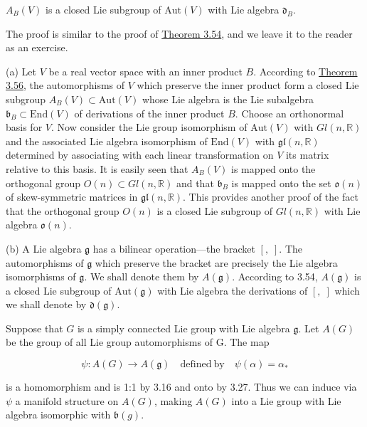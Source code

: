 \begin{theorem}\label{thm:3.56}
$ A_{B}(V) $ is a closed Lie subgroup of  $ \mathrm{Aut}(V) $ with Lie algebra  $ \mathfrak{d}_{B} $.

The proof is similar to the proof of \hyperref[thm:3.54]{Theorem 3.54}, and we leave it to the reader as an exercise.

\end{theorem}
\label{thm:3.57} (a) Let $V$ be a real vector space with an inner product $B$. According to \hyperref[thm:3.56]{Theorem 3.56}, the automorphisms of $V$ which preserve the inner product form a closed Lie subgroup $A_B(V) \subset \mathrm{Aut}(V)$ whose Lie algebra is the Lie subalgebra $\mathfrak{b}_B \subset \mathrm{End}(V)$ of derivations of the inner product $B$. Choose an orthonormal basis for $V$. Now consider the Lie group isomorphism of $\mathrm{Aut}(V)$ with $Gl(n, \mathbb{R})$ and the associated Lie algebra isomorphism of $\mathrm{End}(V)$ with $\mathfrak{gl}(n, \mathbb{R})$ determined by associating with each linear transformation on $V$ its matrix relative to this basis. It is easily seen that $A_B(V)$ is mapped onto the orthogonal group $O(n) \subset Gl(n, \mathbb{R})$ and that $\mathfrak{b}_B$ is mapped onto the set $\mathfrak{o}(n)$ of skew-symmetric matrices in $\mathfrak{gl}(n, \mathbb{R})$. This provides another proof of the fact that the orthogonal group $O(n)$ is a closed Lie subgroup of $Gl(n, \mathbb{R})$ with Lie algebra $\mathfrak{o}(n)$.

(b) A Lie algebra $\mathfrak{g}$ has a bilinear operation—the bracket $[,\;]$. The automorphisms of $\mathfrak{g}$ which preserve the bracket are precisely the Lie algebra isomorphisms of $\mathfrak{g}$. We shall denote them by $A(\mathfrak{g})$. According to 3.54, $A(\mathfrak{g})$ is a closed Lie subgroup of $\mathrm{Aut}(\mathfrak{g})$ with Lie algebra the derivations of $[,\;]$ which we shall denote by $\mathfrak{d}(\mathfrak{g})$.

Suppose that $G$ is a simply connected Lie group with Lie algebra $\mathfrak{g}$. Let  $ A(G) $ be the group of all Lie group automorphisms of G. The map

\begin{equation}
\tag{1}\label{eq:3.57:1}
\psi\colon A(G)\to A(\mathfrak{g})\quad{\mathrm{defined~by}}\quad\psi(\alpha)=\alpha_{*}
\end{equation}

is a homomorphism and is 1:1 by 3.16 and onto by 3.27. Thus we can induce via $\psi$ a manifold structure on $A(G)$, making $A(G)$ into a Lie group with Lie algebra isomorphic with $\mathfrak{b}(g)$.

